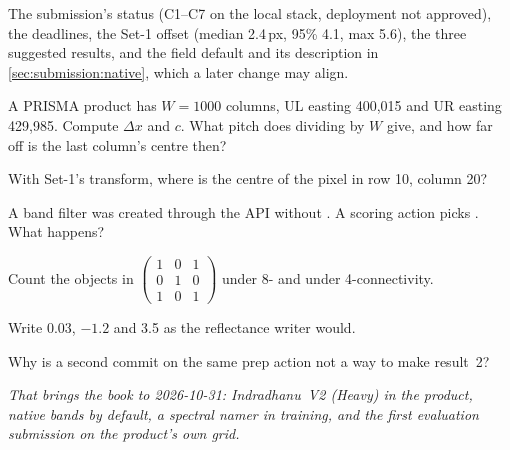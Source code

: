 \begin{drift}
The submission's status (C1--C7 on the local stack, deployment not approved), the deadlines, the Set-1 offset
(median 2.4\,px, 95\% 4.1, max 5.6), the three suggested results, and the field default and its description in
\cref{sec:submission:native}, which a later change may align.
\end{drift}

\begin{confusions}
\end{confusions}

\begin{checkyourself}
\item\label{ex:submission:1} A PRISMA product has $W=1000$ columns, UL easting 400,015 and UR easting 429,985. Compute
  $\Delta x$ and $c$. What pitch does dividing by $W$ give, and how far off is the last column's centre then?
\item\label{ex:submission:2} With Set-1's transform, where is the centre of the pixel in row 10, column 20?
\item\label{ex:submission:3} A band filter was created through the API without . A
  scoring action picks . What happens?
\item\label{ex:submission:4} Count the objects in $\begin{pmatrix}1&0&1\\0&1&0\\1&0&1\end{pmatrix}$ under 8- and under
  4-connectivity.
\item\label{ex:submission:5} Write 0.03, $-1.2$ and 3.5 as the reflectance writer would.
\item\label{ex:submission:6} Why is a second commit on the same prep action not a way to make result~2?
\end{checkyourself}

\par\bigskip\noindent\textit{That brings the book to 2026-10-31: Indradhanu~V2 (Heavy) in the product, native bands by
default, a spectral namer in training, and the first evaluation submission on the product's own grid.}
